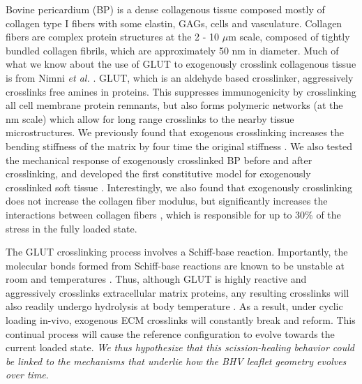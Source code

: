 	Bovine pericardium (BP) is a dense collagenous tissue composed mostly of collagen type I fibers with some elastin, GAGs, cells and vasculature. Collagen fibers are complex protein structures at the 2 - 10 $\mu$m scale, composed of tightly bundled collagen fibrils, which are approximately 50 nm in diameter. Much of what we know about the use of GLUT to exogenously crosslink collagenous tissue is from Nimni \textit{et al.} \cite{cheung_mechanism_1990, nimni_chemically_1987, cheung_mechanism_1985, gendler_toxic_1984, cheung_presence_1983, cheung_mechanism_1982, cheung_mechanism_1982II}. GLUT, which is an aldehyde based crosslinker, aggressively crosslinks free amines in proteins. This suppresses immunogenicity by crosslinking all cell membrane protein remnants, but also forms polymeric networks (at the nm scale) which allow for long range crosslinks to the nearby tissue microstructures. We previously found that exogenous crosslinking increases the bending stiffness of the matrix by four time the original stiffness \cite{mirnajafi_effects_2010}. We also tested the mechanical response of exogenously crosslinked BP before and after crosslinking, and developed the first constitutive model for exogenously crosslinked soft tissue \cite{sacks_novel_2015}. Interestingly, we also found that exogenously crosslinking does not increase the collagen fiber modulus, but significantly increases the interactions between collagen fibers \cite{sacks_novel_2015}, which is responsible for up to 30\% of the stress in the fully loaded state. 


	The GLUT crosslinking process involves a Schiff-base reaction. Importantly, the molecular bonds formed from Schiff-base reactions are known to be unstable at room and temperatures \cite{migneault_glutaraldehyde_2004, damink_glutaraldehyde_1995}. Thus, although GLUT is highly reactive and aggressively crosslinks extracellular matrix proteins, any resulting crosslinks will also readily undergo hydrolysis at body temperature \cite{migneault_glutaraldehyde_2004}. As a result, under cyclic loading in-vivo, exogenous ECM crosslinks will constantly break and reform. This continual process will cause the reference configuration to evolve towards the current loaded state. \emph{We thus hypothesize that this scission-healing behavior could be linked to the mechanisms that underlie how the BHV leaflet geometry evolves over time}.
	
